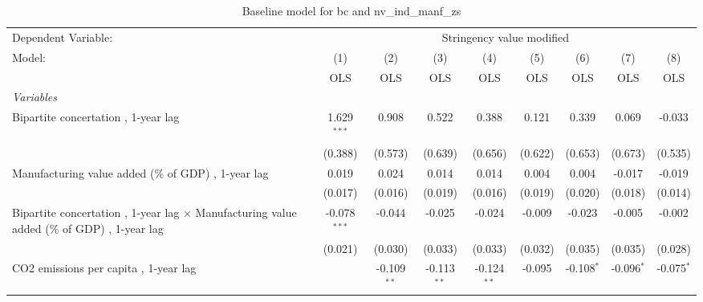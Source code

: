 
\begin{table}[htbp]
   \caption{Baseline model for bc and nv\_ind\_manf\_zs}
   \centering
   \begin{tabular}{lcccccccc}
      \toprule
      Dependent Variable: & \multicolumn{8}{c}{Stringency value modified}\\
      Model:                                                                                            & (1)            & (2)           & (3)           & (4)           & (5)           & (6)           & (7)           & (8)\\  
                                                                                                        &  OLS           & OLS           & OLS           & OLS           & OLS           & OLS           & OLS           & OLS\\  
      \midrule
      \emph{Variables}\\
      Bipartite concertation , 1-year lag                                                               & 1.629$^{***}$  & 0.908         & 0.522         & 0.388         & 0.121         & 0.339         & 0.069         & -0.033\\   
                                                                                                        & (0.388)        & (0.573)       & (0.639)       & (0.656)       & (0.622)       & (0.653)       & (0.673)       & (0.535)\\   
      Manufacturing value added (\% of GDP) , 1-year lag                                                & 0.019          & 0.024         & 0.014         & 0.014         & 0.004         & 0.004         & -0.017        & -0.019\\   
                                                                                                        & (0.017)        & (0.016)       & (0.019)       & (0.016)       & (0.019)       & (0.020)       & (0.018)       & (0.014)\\   
      Bipartite concertation , 1-year lag $\times$ Manufacturing value added (\% of GDP) , 1-year lag   & -0.078$^{***}$ & -0.044        & -0.025        & -0.024        & -0.009        & -0.023        & -0.005        & -0.002\\   
                                                                                                        & (0.021)        & (0.030)       & (0.033)       & (0.033)       & (0.032)       & (0.035)       & (0.035)       & (0.028)\\   
      CO2 emissions per capita , 1-year lag                                                             &                & -0.109$^{**}$ & -0.113$^{**}$ & -0.124$^{**}$ & -0.095        & -0.108$^{*}$  & -0.096$^{*}$  & -0.075$^{*}$\\   

\end{tabular}
\end{table}
